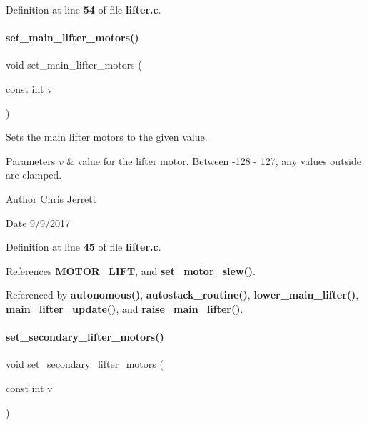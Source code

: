 Definition at line \textbf{ 54} of file \textbf{ lifter.\+c}.

\mbox{\label{lifter_8h_ad00a195af30f246924d6e1a30095b882}} 
\paragraph{set\+\_\+main\+\_\+lifter\+\_\+motors()}
{\footnotesize\ttfamily void set\+\_\+main\+\_\+lifter\+\_\+motors (\begin{DoxyParamCaption}\item[{const int}]{v }\end{DoxyParamCaption})}



Sets the main lifter motors to the given value. 


\begin{DoxyParams}{Parameters}
{\em v} & value for the lifter motor. Between -\/128 -\/ 127, any values outside are clamped. \\
\hline
\end{DoxyParams}
\begin{DoxyAuthor}{Author}
Chris Jerrett 
\end{DoxyAuthor}
\begin{DoxyDate}{Date}
9/9/2017 
\end{DoxyDate}


Definition at line \textbf{ 45} of file \textbf{ lifter.\+c}.



References \textbf{ M\+O\+T\+O\+R\+\_\+\+L\+I\+FT}, and \textbf{ set\+\_\+motor\+\_\+slew()}.



Referenced by \textbf{ autonomous()}, \textbf{ autostack\+\_\+routine()}, \textbf{ lower\+\_\+main\+\_\+lifter()}, \textbf{ main\+\_\+lifter\+\_\+update()}, and \textbf{ raise\+\_\+main\+\_\+lifter()}.

\mbox{\label{lifter_8h_a78640d547d9361951a92d0bc00939536}} 
\paragraph{set\+\_\+secondary\+\_\+lifter\+\_\+motors()}
{\footnotesize\ttfamily void set\+\_\+secondary\+\_\+lifter\+\_\+motors (\begin{DoxyParamCaption}\item[{const int}]{v }\end{DoxyParamCaption})}



